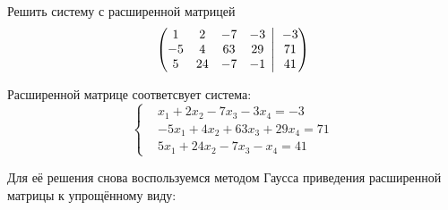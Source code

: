 \documentclass[a4paper,12pt]{article}
\newcommand{\BigMiddleThree}{\;\left|\vphantom{\begin{pmatrix} 0\\0\\0 \end{pmatrix}}\right.\;}
\begin{document}
  Решить систему с расширенной матрицей
  \[
    \left(
      \begin{matrix}
        1 & 2 & -7 & -3\\
        -5 & 4 & 63 & 29\\
        5 & 24 & -7 & -1
      \end{matrix}
      \BigMiddleThree
      \begin{matrix}
        -3\\
        71\\
        41
      \end{matrix}
    \right)
  \]
  
  \begin{solution}
    Расширенной матрице соответсвует система:
    \[
      \left\{
        \begin{aligned}
          &x_1 + 2x_2 - 7x_3 - 3x_4 = -3\\
          &-5x_1 + 4x_2 + 63x_3 + 29x_4 = 71\\
          &5x_1 + 24x_2 - 7x_3 - x_4 = 41
        \end{aligned}
      \right.
    \]
    
    Для её решения снова воспользуемся методом Гаусса приведения расширенной матрицы к упрощённому виду:
    

\end{solution}
\end{document}
